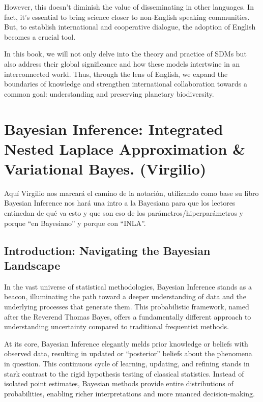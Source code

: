 \documentclass[
]{krantz}
\begin{document}
However, this doesn't diminish the value of disseminating in other languages. In fact, it's essential to bring science closer to non-English speaking communities. But, to establish international and cooperative dialogue, the adoption of English becomes a crucial tool.

In this book, we will not only delve into the theory and practice of SDMs but also address their global significance and how these models intertwine in an interconnected world. Thus, through the lens of English, we expand the boundaries of knowledge and strengthen international collaboration towards a common goal: understanding and preserving planetary biodiversity.

\pagebreak 
\setcounter{chapter}{2}
\setcounter{section}{0}
\renewcommand{\thepage}{\arabic{page}}

\hypertarget{bayesian-inference-integrated-nested-laplace-approximation-variational-bayes.-virgilio}{%
\chapter{Bayesian Inference: Integrated Nested Laplace Approximation \& Variational Bayes. (Virgilio)}\label{bayesian-inference-integrated-nested-laplace-approximation-variational-bayes.-virgilio}}

Aquí Virgilio nos marcará el camino de la notación, utilizando como base su libro Bayesian Inference nos hará una intro a la Bayesiana para que los lectores entinedan de qué va esto y que son eso de los parámetros/hiperparámetros y porque ``en Bayesiano'' y porque con ``INLA''.

\hypertarget{introduction-navigating-the-bayesian-landscape}{%
\section{Introduction: Navigating the Bayesian Landscape}\label{introduction-navigating-the-bayesian-landscape}}

In the vast universe of statistical methodologies, Bayesian Inference stands as a beacon, illuminating the path toward a deeper understanding of data and the underlying processes that generate them. This probabilistic framework, named after the Reverend Thomas Bayes, offers a fundamentally different approach to understanding uncertainty compared to traditional frequentist methods.

At its core, Bayesian Inference elegantly melds prior knowledge or beliefs with observed data, resulting in updated or ``posterior'' beliefs about the phenomena in question. This continuous cycle of learning, updating, and refining stands in stark contrast to the rigid hypothesis testing of classical statistics. Instead of isolated point estimates, Bayesian methods provide entire distributions of probabilities, enabling richer interpretations and more nuanced decision-making.
\end{document}
